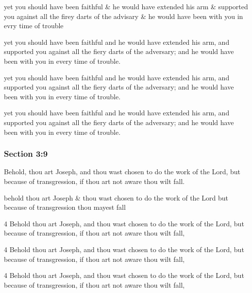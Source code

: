 		\begin{framed}
		\scriptsize
			\begin{compactdesc}
				\item[JSP] yet you should have been faithful \& he would have extended his arm \& supported you against all the firey darts of the advisary \& he would have been with you in evry time of trouble
				\item[BC] yet you should have been faithful and he would have extended his arm, and supported you against all the fiery darts of the adversary; and he would have been with you in every time of trouble. 
				\item[DC 1835] yet you should have been faithful and he would have extended his arm, and supported you against all the fiery darts of the adversary; and he would have been with you in every time of trouble.
				\item[DC 1844] yet you should have been faithful and he would have extended his arm, and supported you against all the fiery darts of the adversary; and he would have been with you in every time of trouble.
			\end{compactdesc}
		\end{framed}

	\subsubsection{Section 3:9} %
		\label{DC3-9}

		Behold, thou art Joseph, and thou wast chosen to do the work of the Lord, but because of transgression, if thou art not aware thou wilt fall.

		\begin{framed}
		\scriptsize
			\begin{compactdesc}
				\item[JSP] behold thou art Joseph \& thou wast chosen to do the work of the Lord but because of transgression thou mayest fall
				\item[BC] 4 Behold thou art Joseph, and thou wast chosen to do the work of the Lord, but because of transgression, if thou art not aware thou wilt fall,
				\item[DC 1835] 4 Behold thou art Joseph, and thou wast chosen to do the work of the Lord, but because of transgression, if thou art not aware thou wilt fall,
				\item[DC 1844] 4 Behold thou art Joseph, and thou wast chosen to do the work of the Lord, but because of transgression, if thou art not aware thou wilt fall,
			\end{compactdesc}
		\end{framed}

